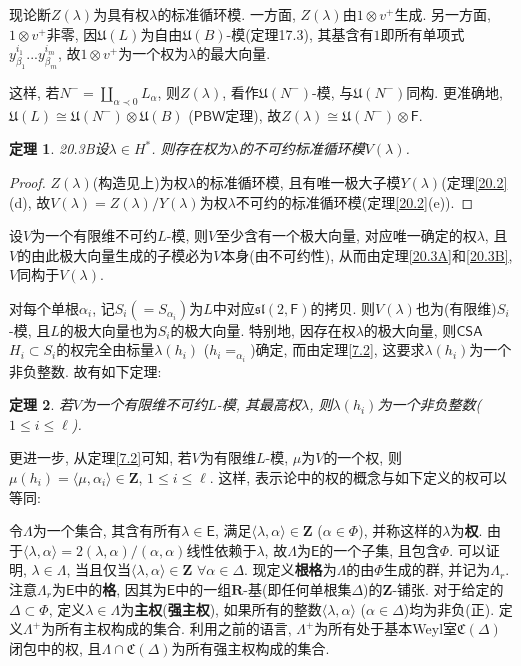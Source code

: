 \documentclass{ctexart}%
\newtheorem{theorem}{定理}
\theoremstyle{definition}
\theoremstyle{remark}
\begin{document}
现论断$Z(\lambda)$为具有权$\lambda$的标准循环模. 一方面, $Z(\lambda)$由$1\otimes v^+$生成. 另一方面, $1\otimes v^+$非零, 因$\mathfrak{U}(L)$为自由$\mathfrak{U}(B)$-模(定理17.3), 其基含有$1$即所有单项式$y^{i_1}_{\beta_1}...y^{i_m}_{\beta_m}$, 故$1\otimes v^+$为一个权为$\lambda$的最大向量. 

这样, 若$N^-=\coprod_{\alpha\prec 0} L_\alpha$, 则$Z(\lambda)$, 看作$\mathfrak{U}(N^-)$-模, 与$\mathfrak{U}(N^-)$同构. 更准确地, $\mathfrak{U}(L)\cong \mathfrak{U}(N^-)\otimes \mathfrak{U}(B)$ ($\mathsf{PBW}$定理), 故$Z(\lambda) \cong \mathfrak{U}(N^-)\otimes \mathsf{F}$. 

\begin{theorem}{20.3B}设$\lambda\in H^*$. 则存在权为$\lambda$的不可约标准循环模$V(\lambda)$.
\end{theorem}
\begin{proof}
$Z(\lambda)$(构造见上)为权$\lambda$的标准循环模, 且有唯一极大子模$Y(\lambda)$(定理\ref{20.2}(d), 故$V(\lambda)=Z(\lambda)/Y(\lambda)$为权$\lambda$不可约的标准循环模(定理\ref{20.2}(e)).
\end{proof} 

设$V$为一个有限维不可约$L$-模, 则$V$至少含有一个极大向量, 对应唯一确定的权$\lambda$, 且$V$的由此极大向量生成的子模必为$V$本身(由不可约性), 从而由定理\ref{20.3A}和\ref{20.3B}, $V$同构于$V(\lambda)$.

对每个单根$\alpha_i$, 记$S_i(=S_{\alpha_i})$为$L$中对应$\mathfrak{sl}(2,\mathsf{F})$的拷贝. 则$V(\lambda)$也为(有限维)$S_i$-模, 且$L$的极大向量也为$S_i$的极大向量. 特别地, 因存在权$\lambda$的极大向量, 则$\mathsf{CSA}$ $H_i\subset S_i$的权完全由标量$\lambda(h_i)$ ($h_i=_{\alpha_i}$)确定, 而由定理\ref{7.2}, 这要求$\lambda(h_i)$为一个非负整数. 故有如下定理:

\begin{theorem}
若$V$为一个有限维不可约$L$-模, 其最高权$\lambda$, 则$\lambda(h_i)$为一个非负整数($1\leq i\leq \ell$).
\end{theorem}
更进一步, 从定理\ref{7.2}可知, 若$V$为有限维$L$-模, $\mu$为$V$的一个权, 则$\mu(h_i)=\langle \mu,\alpha_i\rangle \in \mathbf{Z}$, $1\leq i\leq \ell$. 这样, 表示论中的权的概念与如下定义的权可以等同:

令$\Lambda$为一个集合, 其含有所有$\lambda \in\mathsf{E}$, 满足$\langle \lambda,\alpha\rangle \in\mathbf{Z}$ ($\alpha\in\Phi$), 并称这样的$\lambda$为\textbf{权}. 由于$\langle\lambda,\alpha\rangle = 2(\lambda,\alpha)/(\alpha,\alpha)$线性依赖于$\lambda$, 故$\Lambda$为$\mathsf{E}$的一个子集, 且包含$\Phi$. 可以证明, $\lambda\in\Lambda$, 当且仅当$\langle \lambda,\alpha\rangle\in \mathbf{Z}$ $\forall \alpha\in\Delta$. 现定义\textbf{根格}为$\Lambda$的由$\Phi$生成的群, 并记为$\Lambda_r$. 注意$\Lambda_r$为$\mathsf{E}$中的\textbf{格}, 因其为$\mathsf{E}$中的一组$\mathbf{R}$-基(即任何单根集$\Delta$)的$\mathbf{Z}$-铺张. 对于给定的$\Delta\subset \Phi$, 定义$\lambda \in \Lambda$为\textbf{主权}(\textbf{强主权}), 如果所有的整数$\langle \lambda,\alpha\rangle$ ($\alpha\in\Delta$)均为非负(正). 定义$\Lambda^+$为所有主权构成的集合. 利用之前的语言, $\Lambda^+$为所有处于基本Weyl室$\mathfrak{C}(\Delta)$闭包中的权, 且$\Lambda \cap \mathfrak{C}(\Delta)$为所有强主权构成的集合.
\end{document}
